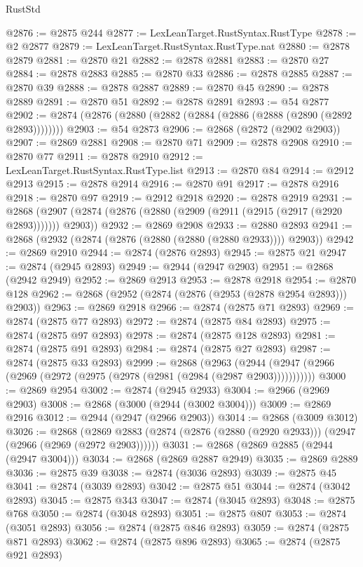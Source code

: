 \begin{lexlean}{RustStd}
\begin{coremodule}
{{{{{{{{{{{{{{{{{{{@2876 := @2875 @244
@2877 := LexLeanTarget.RustSyntax.RustType
@2878 := @2 @2877
@2879 := LexLeanTarget.RustSyntax.RustType.nat
@2880 := @2878 @2879
@2881 := @2870 @21
@2882 := @2878 @2881
@2883 := @2870 @27
@2884 := @2878 @2883
@2885 := @2870 @33
@2886 := @2878 @2885
@2887 := @2870 @39
@2888 := @2878 @2887
@2889 := @2870 @45
@2890 := @2878 @2889
@2891 := @2870 @51
@2892 := @2878 @2891
@2893 := @54 @2877
@2902 := @2874 (@2876 (@2880 (@2882 (@2884 (@2886 (@2888 (@2890 (@2892 @2893))))))))
@2903 := @54 @2873
@2906 := @2868 (@2872 (@2902 @2903))
@2907 := @2869 @2881
@2908 := @2870 @71
@2909 := @2878 @2908
@2910 := @2870 @77
@2911 := @2878 @2910
@2912 := LexLeanTarget.RustSyntax.RustType.list
@2913 := @2870 @84
@2914 := @2912 @2913
@2915 := @2878 @2914
@2916 := @2870 @91
@2917 := @2878 @2916
@2918 := @2870 @97
@2919 := @2912 @2918
@2920 := @2878 @2919
@2931 := @2868 (@2907 (@2874 (@2876 (@2880 (@2909 (@2911 (@2915 (@2917 (@2920 @2893))))))) @2903))
@2932 := @2869 @2908
@2933 := @2880 @2893
@2941 := @2868 (@2932 (@2874 (@2876 (@2880 (@2880 (@2880 @2933)))) @2903))
@2942 := @2869 @2910
@2944 := @2874 (@2876 @2893)
@2945 := @2875 @21
@2947 := @2874 (@2945 @2893)
@2949 := @2944 (@2947 @2903)
@2951 := @2868 (@2942 @2949)
@2952 := @2869 @2913
@2953 := @2878 @2918
@2954 := @2870 @128
@2962 := @2868 (@2952 (@2874 (@2876 (@2953 (@2878 @2954 @2893))) @2903))
@2963 := @2869 @2918
@2966 := @2874 (@2875 @71 @2893)
@2969 := @2874 (@2875 @77 @2893)
@2972 := @2874 (@2875 @84 @2893)
@2975 := @2874 (@2875 @97 @2893)
@2978 := @2874 (@2875 @128 @2893)
@2981 := @2874 (@2875 @91 @2893)
@2984 := @2874 (@2875 @27 @2893)
@2987 := @2874 (@2875 @33 @2893)
@2999 := @2868
    (@2963 (@2944 (@2947 (@2966 (@2969 (@2972 (@2975 (@2978 (@2981 (@2984 (@2987 @2903)))))))))))
@3000 := @2869 @2954
@3002 := @2874 (@2945 @2933)
@3004 := @2966 (@2969 @2903)
@3008 := @2868 (@3000 (@2944 (@3002 @3004)))
@3009 := @2869 @2916
@3012 := @2944 (@2947 (@2966 @2903))
@3014 := @2868 (@3009 @3012)
@3026 := @2868
    (@2869 @2883 (@2874 (@2876 (@2880 (@2920 @2933))) (@2947 (@2966 (@2969 (@2972 @2903))))))
@3031 := @2868 (@2869 @2885 (@2944 (@2947 @3004)))
@3034 := @2868 (@2869 @2887 @2949)
@3035 := @2869 @2889
@3036 := @2875 @39
@3038 := @2874 (@3036 @2893)
@3039 := @2875 @45
@3041 := @2874 (@3039 @2893)
@3042 := @2875 @51
@3044 := @2874 (@3042 @2893)
@3045 := @2875 @343
@3047 := @2874 (@3045 @2893)
@3048 := @2875 @768
@3050 := @2874 (@3048 @2893)
@3051 := @2875 @807
@3053 := @2874 (@3051 @2893)
@3056 := @2874 (@2875 @846 @2893)
@3059 := @2874 (@2875 @871 @2893)
@3062 := @2874 (@2875 @896 @2893)
@3065 := @2874 (@2875 @921 @2893)
}}}}}}}}}}}}}}}}}}}
\end{coremodule}
\end{lexlean}

